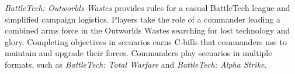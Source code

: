 \emph{BattleTech: Outworlds Wastes} provides rules for a casual BattleTech league and simplified campaign logistics.
Players take the role of a commander leading a combined arms force in the Outworlds Wastes searching for lost technology and glory.
Completing objectives in scenarios earns C-bills that commanders use to maintain and upgrade their forces.
Commanders play scenarios in multiple formats, such as \emph{BattleTech: Total Warfare} and \emph{BattleTech: Alpha Strike}.
